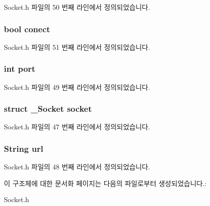 Socket.\-h 파일의 50 번째 라인에서 정의되었습니다.

\hypertarget{struct_socket_extends_a506634736b4585cbeac7cbdefec1e540}{
\subsubsection[{conect}]{\setlength{\rightskip}{0pt plus 5cm}bool conect}}\label{struct_socket_extends_a506634736b4585cbeac7cbdefec1e540}


Socket.\-h 파일의 51 번째 라인에서 정의되었습니다.

\hypertarget{struct_socket_extends_a63c89c04d1feae07ca35558055155ffb}{
\subsubsection[{port}]{\setlength{\rightskip}{0pt plus 5cm}int port}}\label{struct_socket_extends_a63c89c04d1feae07ca35558055155ffb}


Socket.\-h 파일의 49 번째 라인에서 정의되었습니다.

\hypertarget{struct_socket_extends_a6d8ff51667f3038e4e0974b8dfcb8b59}{
\subsubsection[{socket}]{\setlength{\rightskip}{0pt plus 5cm}struct {\bf \-\_\-\-Socket} socket}}\label{struct_socket_extends_a6d8ff51667f3038e4e0974b8dfcb8b59}


Socket.\-h 파일의 47 번째 라인에서 정의되었습니다.

\hypertarget{struct_socket_extends_a983d3a00cb7e2cdac046d6ef1ce9f8f2}{
\subsubsection[{url}]{\setlength{\rightskip}{0pt plus 5cm}String url}}\label{struct_socket_extends_a983d3a00cb7e2cdac046d6ef1ce9f8f2}


Socket.\-h 파일의 48 번째 라인에서 정의되었습니다.



이 구조체에 대한 문서화 페이지는 다음의 파일로부터 생성되었습니다.\-:\begin{DoxyCompactItemize}
\item 
Socket.\-h\end{DoxyCompactItemize}
